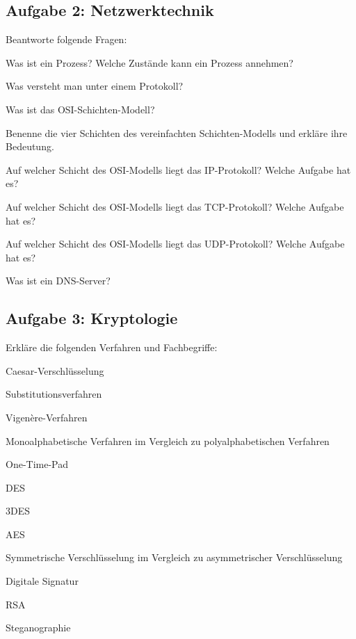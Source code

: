 \subsection{Aufgabe 2: Netzwerktechnik}

Beantworte folgende Fragen:

\begin{compactenum}
\item Was ist ein Prozess? Welche Zustände kann ein Prozess annehmen?
\item Was versteht man unter einem Protokoll?
\item Was ist das OSI-Schichten-Modell?
\item Benenne die vier Schichten des vereinfachten Schichten-Modells und erkläre
 ihre Bedeutung.
\item Auf welcher Schicht des OSI-Modells liegt das IP-Protokoll? Welche Aufgabe
hat es?
\item Auf welcher Schicht des OSI-Modells liegt das TCP-Protokoll? Welche
Aufgabe hat es?
\item Auf welcher Schicht des OSI-Modells liegt das UDP-Protokoll? Welche
Aufgabe hat es?
\item Was ist ein DNS-Server?
\end{compactenum}

\subsection{Aufgabe 3: Kryptologie}

Erkläre die folgenden Verfahren und Fachbegriffe:

\begin{compactenum}
\item Caesar-Verschlüsselung
\item Substitutionsverfahren
\item Vigenère-Verfahren
\item Monoalphabetische Verfahren im Vergleich zu polyalphabetischen Verfahren
\item One-Time-Pad
\item DES
\item 3DES
\item AES
\item Symmetrische Verschlüsselung im Vergleich zu asymmetrischer
Verschlüsselung
\item Digitale Signatur
\item RSA
\item Steganographie
\end{compactenum}


